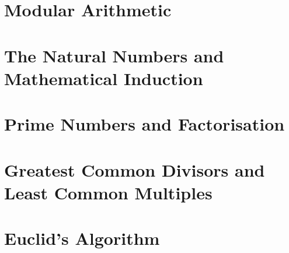 \section{Modular Arithmetic}
\label{chap:ModularArithmetic}

\section{The Natural Numbers and Mathematical Induction}
\label{chap:NaturalNumbersAndMathematicalInduction}

\section{Prime Numbers and Factorisation}
\label{sec:PrimeNumbersAndFactorisation}

\section{Greatest Common Divisors and Least Common Multiples}
\label{sec:GCDandLCM}

\section{Euclid's Algorithm}
\label{sec:EuclidsAlgorithm}


